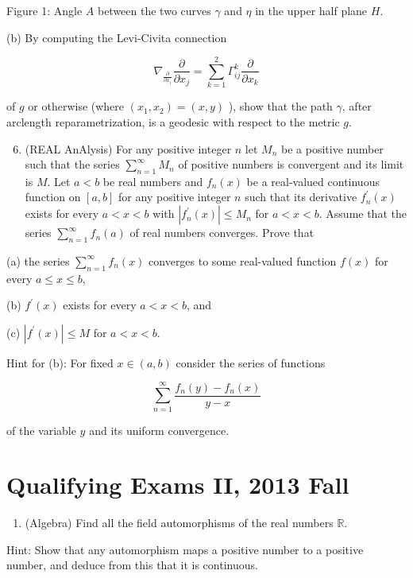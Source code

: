 \documentclass[10pt]{article}
\begin{document}
Figure 1: Angle $A$ between the two curves $\gamma$ and $\eta$ in the upper half plane $H$.

(b) By computing the Levi-Civita connection

$$
\nabla_{\frac{\partial}{\partial x_{i}}} \frac{\partial}{\partial x_{j}}=\sum_{k=1}^{2} \Gamma_{i j}^{k} \frac{\partial}{\partial x_{k}}
$$

of $g$ or otherwise (where $\left(x_{1}, x_{2}\right)=(x, y)$ ), show that the path $\gamma$, after arclength reparametrization, is a geodesic with respect to the metric $g$.

\begin{enumerate}
  \setcounter{enumi}{5}
  \item (REAL AnAlysis) For any positive integer $n$ let $M_{n}$ be a positive number such that the series $\sum_{n=1}^{\infty} M_{n}$ of positive numbers is convergent and its limit is $M$. Let $a<b$ be real numbers and $f_{n}(x)$ be a real-valued continuous function on $[a, b]$ for any positive integer $n$ such that its derivative $f_{n}^{\prime}(x)$ exists for every $a<x<b$ with $\left|f_{n}^{\prime}(x)\right| \leq M_{n}$ for $a<x<b$. Assume that the series $\sum_{n=1}^{\infty} f_{n}(a)$ of real numbers converges. Prove that
\end{enumerate}

(a) the series $\sum_{n=1}^{\infty} f_{n}(x)$ converges to some real-valued function $f(x)$ for every $a \leq x \leq b$,

(b) $f^{\prime}(x)$ exists for every $a<x<b$, and

(c) $\left|f^{\prime}(x)\right| \leq M$ for $a<x<b$.

Hint for (b): For fixed $x \in(a, b)$ consider the series of functions

$$
\sum_{n=1}^{\infty} \frac{f_{n}(y)-f_{n}(x)}{y-x}
$$

of the variable $y$ and its uniform convergence.

\section{Qualifying Exams II, 2013 Fall}
\begin{enumerate}
  \item (Algebra) Find all the field automorphisms of the real numbers $\mathbb{R}$.
\end{enumerate}

Hint: Show that any automorphism maps a positive number to a positive number, and deduce from this that it is continuous.
\end{document}
